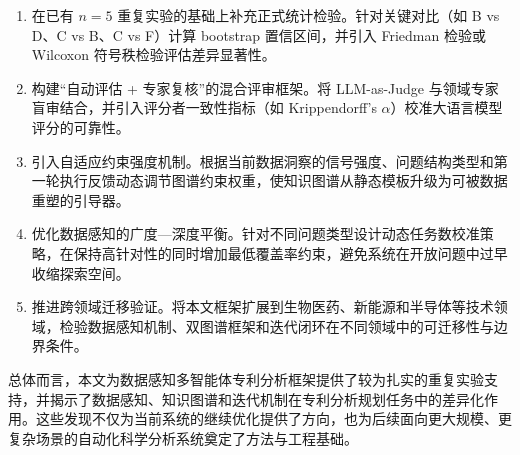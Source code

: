 \begin{enumerate}[(1)]
\item 在已有 $n=5$ 重复实验的基础上补充正式统计检验。针对关键对比（如 B vs D、C vs B、C vs F）计算 bootstrap 置信区间，并引入 Friedman 检验或 Wilcoxon 符号秩检验评估差异显著性。
\item 构建“自动评估 + 专家复核”的混合评审框架。将 LLM-as-Judge 与领域专家盲审结合，并引入评分者一致性指标（如 Krippendorff's $\alpha$）校准大语言模型评分的可靠性。
\item 引入自适应约束强度机制。根据当前数据洞察的信号强度、问题结构类型和第一轮执行反馈动态调节图谱约束权重，使知识图谱从静态模板升级为可被数据重塑的引导器。
\item 优化数据感知的广度—深度平衡。针对不同问题类型设计动态任务数校准策略，在保持高针对性的同时增加最低覆盖率约束，避免系统在开放问题中过早收缩探索空间。
\item 推进跨领域迁移验证。将本文框架扩展到生物医药、新能源和半导体等技术领域，检验数据感知机制、双图谱框架和迭代闭环在不同领域中的可迁移性与边界条件。
\end{enumerate}

总体而言，本文为数据感知多智能体专利分析框架提供了较为扎实的重复实验支持，并揭示了数据感知、知识图谱和迭代机制在专利分析规划任务中的差异化作用。这些发现不仅为当前系统的继续优化提供了方向，也为后续面向更大规模、更复杂场景的自动化科学分析系统奠定了方法与工程基础。
